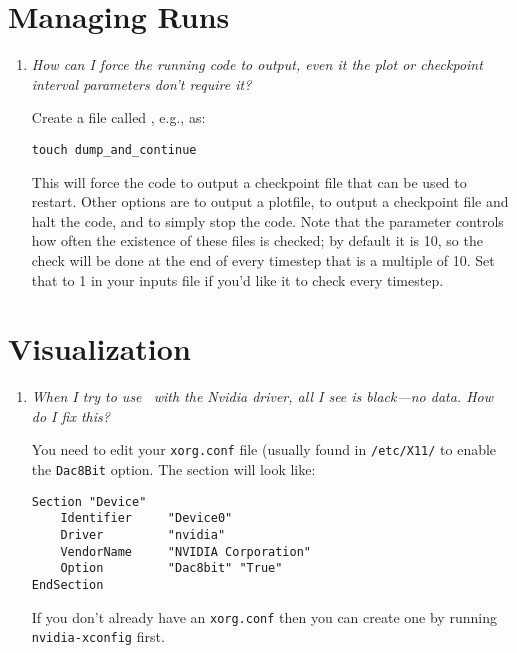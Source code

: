 \section{Managing Runs}

\begin{enumerate}

\item {\em How can I force the running code to output, even it the plot or
 checkpoint interval parameters don't require it?}

Create a file called , e.g., as:
\begin{verbatim}
touch dump_and_continue
\end{verbatim}

This will force the code to output a checkpoint file that can be used
to restart.  Other options are  to output
a plotfile,  to output a checkpoint file
and halt the code, and  to simply stop the code.
Note that the parameter  controls how often
the existence of these files is checked; by default it is 10, so the
check will be done at the end of every timestep that is a multiple of 10.
Set that to 1 in your inputs file if you'd like it to check every timestep.

\end{enumerate}

\section{Visualization}

\label{ch:faq:vis}

\begin{enumerate}

\item {\em When I try to use \amrvis\ with the Nvidia driver, all I see is
  black---no data.  How do I fix this?}

  You need to edit your {\tt xorg.conf} file (usually found in {\tt /etc/X11/}
to enable the {\tt Dac8Bit} option.  The section will look like:
\begin{verbatim}
Section "Device"
    Identifier     "Device0"
    Driver         "nvidia"
    VendorName     "NVIDIA Corporation"
    Option         "Dac8bit" "True"
EndSection
\end{verbatim}
If you don't already have an {\tt xorg.conf} then you can create one
by running {\tt nvidia-xconfig} first.


\end{enumerate}
